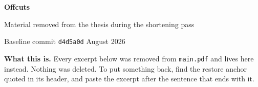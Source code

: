 \newenvironment{offcut}[5]{\offcuthead{#1}{#2}{#3}{#4}{#5}}%
  {\par\bigskip\noindent\textcolor{KULblauw3b!40}{\rule{\linewidth}{0.6pt}}\par\bigskip}

\newenvironment{offcutrewrite}[5]{%
  \offcuthead{#1}{#2}{#3}{#4}{#5}%
  \noindent{\sffamily\bfseries\small\textcolor{KULblauw3b}{WAS}}\par\smallskip}%
  {\par\bigskip\noindent\textcolor{KULblauw3b!40}{\rule{\linewidth}{0.6pt}}\par\bigskip}

\newcommand{\offcutlabel}[1]{}

\newcommand{\nowreads}{\par\medskip\noindent
  {\sffamily\bfseries\small\textcolor{KULblauw3b}{IS NOW}}\par\smallskip}




\begin{center}
{\sffamily\bfseries\Large Offcuts}\par\smallskip
{\sffamily\small Material removed from the thesis during the shortening pass}\par\smallskip
{\sffamily\footnotesize Baseline commit \texttt{d4d5a0d} \quad\textbullet{} August 2026}
\end{center}

\bigskip

\noindent\textbf{What this is.} Every excerpt below was removed from
\texttt{main.pdf} and lives here instead. Nothing was deleted. To put something
back, find the restore anchor quoted in its header, and paste the excerpt after
the sentence that ends with it.

